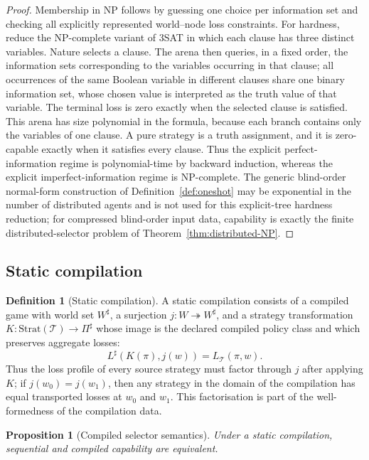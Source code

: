 \documentclass[11pt]{article}
\theoremstyle{plain}
\newtheorem{proposition}[theorem]{Proposition}
\theoremstyle{definition}
\newtheorem{definition}[theorem]{Definition}
\theoremstyle{remark}
\begin{document}
\begin{proof}
Membership in NP follows by guessing one choice per information set and checking
all explicitly represented world--node loss constraints. For hardness, reduce the NP-complete variant of 3SAT in which each clause has
three distinct variables. Nature selects a clause. The arena then queries, in a
fixed order, the information sets corresponding to the variables occurring in
that clause;
all occurrences of the same Boolean variable in different clauses share one
binary information set, whose chosen value is interpreted as the truth value of
that variable. The terminal loss is zero exactly when the selected clause is
satisfied. This arena has size polynomial in the formula, because each branch
contains only the variables of one clause. A pure strategy is a truth assignment,
and it is zero-capable exactly when it satisfies every clause. Thus the explicit
perfect-information regime is polynomial-time by backward induction, whereas the
explicit imperfect-information regime is NP-complete. The generic blind-order
normal-form construction of Definition~\ref{def:oneshot} may be exponential in
the number of distributed agents and is not used for this explicit-tree hardness
reduction; for compressed blind-order input data, capability is exactly the
finite distributed-selector problem of Theorem~\ref{thm:distributed-NP}.
\end{proof}




\subsection{Static compilation}

\begin{definition}[Static compilation]\label{def:staticcomp}
A static compilation consists of a compiled game with world set $W^\sharp$, a
surjection $j:W\twoheadrightarrow W^\sharp$, and a strategy transformation
$K:\mathrm{Strat}(\mathcal T)\to\Pi^\sharp$ whose image is the declared
compiled policy class and which preserves aggregate losses:
\[
L^\sharp(K(\pi),j(w))=L_{\mathcal T}(\pi,w).
\]
Thus the loss profile of every source strategy must factor through $j$ after
applying $K$; if $j(w_0)=j(w_1)$, then any strategy in the domain of the
compilation has equal transported losses at $w_0$ and $w_1$. This factorisation
is part of the well-formedness of the compilation data.
\end{definition}

\begin{proposition}[Compiled selector semantics]\label{prop:FBcompile}
Under a static compilation, sequential and compiled capability are equivalent.
\end{proposition}
\end{document}

